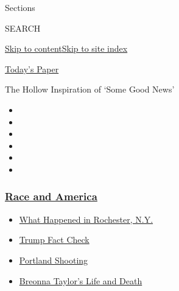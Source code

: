 Sections

SEARCH

\protect\hyperlink{site-content}{Skip to
content}\protect\hyperlink{site-index}{Skip to site index}

\href{https://myaccount.nytimes3xbfgragh.onion/auth/login?response_type=cookie\&client_id=vi}{}

\href{https://www.nytimes3xbfgragh.onion/section/todayspaper}{Today's
Paper}

The Hollow Inspiration of `Some Good News'

\begin{itemize}
\item
\item
\item
\item
\item
\item
\end{itemize}

\hypertarget{race-and-america}{%
\subsubsection{\texorpdfstring{\href{https://www.nytimes3xbfgragh.onion/news-event/george-floyd-protests-minneapolis-new-york-los-angeles?name=styln-george-floyd\&region=TOP_BANNER\&block=storyline_menu_recirc\&action=click\&pgtype=Article\&impression_id=8acbecd0-f1e0-11ea-9518-95db608f788b\&variant=undefined}{Race
and America}}{Race and America}}\label{race-and-america}}

\begin{itemize}
\tightlist
\item
  \href{https://www.nytimes3xbfgragh.onion/2020/09/04/nyregion/rochester-police-daniel-prude.html?name=styln-george-floyd\&region=TOP_BANNER\&block=storyline_menu_recirc\&action=click\&pgtype=Article\&impression_id=8acbecd1-f1e0-11ea-9518-95db608f788b\&variant=undefined}{What
  Happened in Rochester, N.Y.}
\item
  \href{https://www.nytimes3xbfgragh.onion/2020/09/01/us/politics/trump-fact-check-protests.html?name=styln-george-floyd\&region=TOP_BANNER\&block=storyline_menu_recirc\&action=click\&pgtype=Article\&impression_id=8acc13e0-f1e0-11ea-9518-95db608f788b\&variant=undefined}{Trump
  Fact Check}
\item
  \href{https://www.nytimes3xbfgragh.onion/2020/08/30/us/portland-shooting-explained.html?name=styln-george-floyd\&region=TOP_BANNER\&block=storyline_menu_recirc\&action=click\&pgtype=Article\&impression_id=8acc13e1-f1e0-11ea-9518-95db608f788b\&variant=undefined}{Portland
  Shooting}
\item
  \href{https://www.nytimes3xbfgragh.onion/2020/08/30/us/breonna-taylor-police-killing.html?name=styln-george-floyd\&region=TOP_BANNER\&block=storyline_menu_recirc\&action=click\&pgtype=Article\&impression_id=8acc13e2-f1e0-11ea-9518-95db608f788b\&variant=undefined}{Breonna
  Taylor's Life and Death}
\end{itemize}

